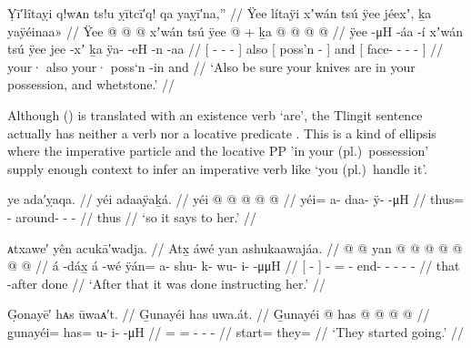 \ex\label{ex:92-95-your-knife-and-whetstone}%
%
\begingl
	\glpreamble	Ỵī′łîtaỵi q!wᴀn ts!u ỵītcī′q! qa yaỵī′na,” //
	\glpreamble	Ÿee lítaÿi xʼwán tsú ÿee jéexʼ, ḵa yaÿéinaa\!» //
	\gla	{} Ÿee  @ {} @ {} @ {} {}	xʼwán tsú
		{} ÿee  @ {} {} +
		ḵa {}  @ {} @ {} @ {} @ {} {} //
	\glb	{} ÿee  -μH -áa -í {} xʼwán tsú
		{} ÿee jee -xʼ {}
		ḵa {} ÿa-  -eH -n -aa {} //
	\glc	{}[   - - - {}]
			 also
		{}[  poss’n - {}]
		and
		{}[ face-  - - - {}] //
	\gld	{} your·  {} {} {} {}  also
		{} your· poss‘n -in {}
		and {}  {} {} {} {} {} //
	\glft	‘Also be sure your knives are in your possession, and whetstone.’
		//
\endgl
\xe

Although (\lastx) is translated with an existence verb ‘are’, the Tlingit sentence actually has neither a verb nor a locative predicate .
This is a kind of ellipsis where the imperative particle  and the locative PP  ’in your (pl.)\ possession’ supply enough context to infer an imperative verb like  ‘you (pl.)\ handle it’.

\ex\label{ex:92-96-says-to-her}%
%
\begingl
	\glpreamble	ye ada′ỵaqa. //
	\glpreamble	yéi adaaÿaḵá. //
	\gla	yéi @  @ {} @ {} @ {} @ {} //
	\glb	yéi= a- daa- ÿ-  -μH //
	\glc	thus= - around- -  - //
	\gld	thus  {} {} {} {} //
	\glft	‘so it says to her.’
		//
\endgl
\xe

\ex\label{ex:92-97-done-instructing}%
%
\begingl
	\glpreamble	ᴀtxawe′ yên acukā′wadja. //
	\glpreamble	Atx̱ áwé yan ashukaawajáa. //
	\gla	{}  @ {} {}  @ {}
		yan @  @ {} @ {} @ {} @ {} @ {} @ {} //
	\glb	{} á -dáx̱ {} á -wé
		ÿán= a- shu- k- wu- i-  -μμH //
	\glc	{}[  - {}]  -
		= - end- - - -
			 - //
	\gld	{} that -after {}  {}
		done  {} {} {} {} {} {} //
	\glft	‘After that it was done instructing her.’
		//
\endgl
\xe

\ex\label{ex:92-98-started-going}%
%
\begingl
	\glpreamble	G̣onayē′ hᴀs ūwaᴀ′t. //
	\glpreamble	G̱unayéi has uwa.át. //
	\gla	G̱unayéi @ has @  @ {} @ {} @ {} //
	\glb	g̱unayéi= has= u- i-  -μH //
	\glc	{}= = - -  - //
	\gld	start= they=  {} {} {} //
	\glft	‘They started going.’
		//
\endgl
\xe

